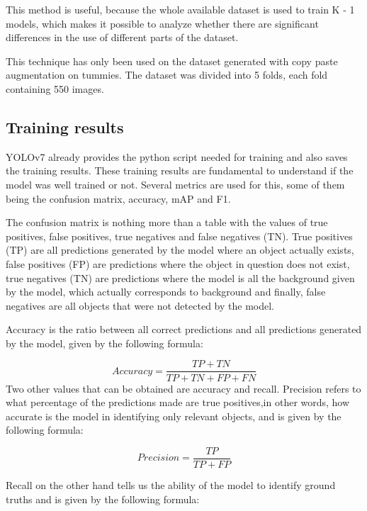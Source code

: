 This method is useful, because the whole available dataset is used to train K - 1 models, which makes it possible to analyze whether there are significant differences in the use of different parts of the dataset.

This technique has only been used on the dataset generated with copy paste augmentation on tummies. The dataset was divided into 5 folds, each fold containing 550 images.



\subsection{Training results}

YOLOv7 already provides the python script needed for training and also saves the training results. These training results are fundamental to understand if the model was well trained or not. Several metrics are used for this, some of them being the confusion matrix, accuracy, mAP and F1.

The confusion matrix is nothing more than a table with the values of true positives, false positives, true negatives and false negatives (TN). True positives (TP) are all predictions generated by the model where an object actually exists, false positives (FP) are predictions where the object in question does not exist, true negatives (TN) are predictions where the model is all the background given by the model, which actually corresponds to background and finally, false negatives are all objects that were not detected by the model.

Accuracy is the ratio between all correct predictions and all predictions generated by the model, given by the following formula:

\begin{equation}
     Accuracy = \frac{TP + TN}{TP + TN + FP + FN}
\end{equation}
Two other values that can be obtained are accuracy and recall\cite{https://towardsdatascience.com/on-object-detection-metrics-with-worked-example-216f173ed31e}. Precision refers to what percentage of the predictions made are true positives,in other words, how accurate is the model in identifying only relevant objects, and is given by the following formula:

\begin{equation}
     Precision = \frac{TP }{TP + FP}
\end{equation}

Recall on the other hand tells us the ability of the model to identify ground truths and is given by the following formula:

